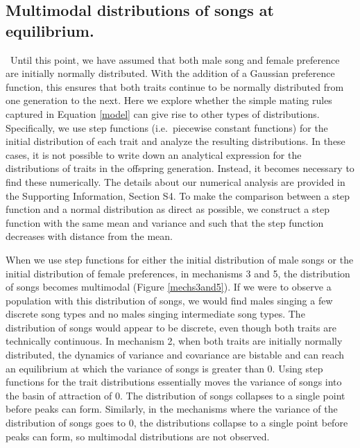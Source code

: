 \documentclass[12pt]{article}
\begin{document}
\subsection*{Multimodal distributions of songs at equilibrium. }
\ Until this point, we have assumed that both male song and female preference are initially normally distributed. With the addition of a Gaussian preference function, this ensures that both traits continue to be normally distributed from one generation to the next. Here we explore whether the simple mating rules captured in Equation \ref{model} can give rise to other types of distributions. Specifically, we use step functions (i.e.\ piecewise constant functions) for the initial distribution of each trait and analyze the resulting distributions. In these cases, it is not possible to write down an analytical expression for the distributions of traits in the offspring generation. Instead, it becomes necessary to find these numerically. The details about our numerical analysis are provided in the Supporting Information, Section S4. To make the comparison between a step function and a normal distribution as direct as possible, we construct a step function with the same mean and variance and such that the step function decreases with distance from the mean.  
  
When we use step functions for either the initial distribution of male songs or the initial distribution of female preferences, in mechanisms 3 and 5, the distribution of songs becomes multimodal (Figure \ref{mechs3and5}). If we were to observe a population with this distribution of songs, we would find males singing a few discrete song types and no males singing intermediate song types. The distribution of songs would appear to be discrete, even though both traits are technically continuous. In mechanism 2, when both traits are initially normally distributed, the dynamics of variance and covariance are bistable and can reach an equilibrium at which the variance of songs is greater than $0$. Using step functions for the trait distributions essentially moves the variance of songs into the basin of attraction of $0$. The distribution of songs collapses to a single point before peaks can form. Similarly, in the mechanisms where the variance of the distribution of songs goes to $0$, the distributions collapse to a single point before peaks can form, so multimodal distributions are not observed.  
\end{document}
